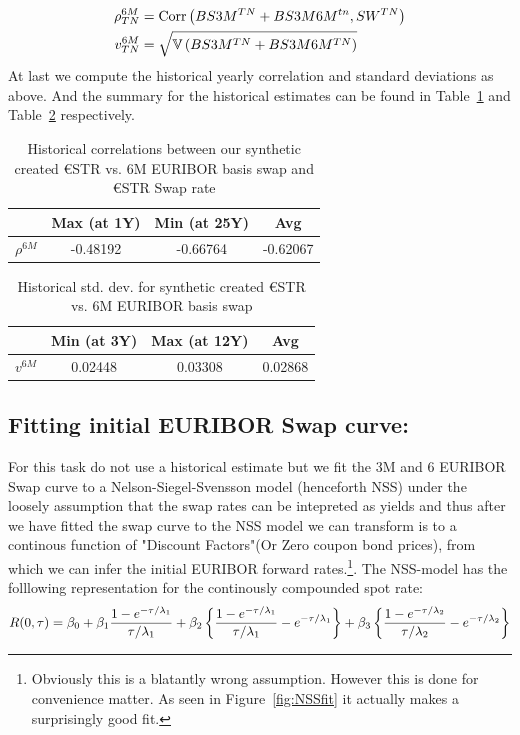 \documentclass[12pt]{article}
\begin{document}
\begin{equation}
    \notag \begin{aligned}
        \rho^{6M}_{TN} &= \text{Corr} \left(BS3M^{TN} + BS3M6M^{tn} , SW^{TN}  \right)
    \\ v^{6M}_{TN} & = \sqrt{\mathbb{V} \left( BS3M^{TN} + BS3M6M^{TN} \right)}
    \end{aligned}
\end{equation}
At last we compute the historical yearly correlation and standard deviations
as above. And the summary for the historical estimates can be found
in Table~\ref{tab:Corr6MBasis} and Table~\ref{tab:stdDev6MBasis} respectively.
\begin{table}[H]
    \centering
    \begin{tabular}{|c|c|c|c|}
    \hline
        &Max (at 1Y) & Min (at 25Y) & Avg  \\ \hline \hline
       $\rho^{6M}$& -0.48192 & -0.66764 & -0.62067  \\ \hline
    \end{tabular}
    \caption{Historical correlations between our synthetic created €STR vs. 6M EURIBOR
    basis swap and €STR Swap rate}
    \label{tab:Corr6MBasis}
\end{table}
\begin{table}[H]
    \centering
    \begin{tabular}{|c|c|c|c|}
    \hline
            &  Min (at 3Y) & Max (at 12Y) & Avg  \\ \hline \hline
       $v^{6M}$ & 0.02448 & 0.03308 & 0.02868 \\ \hline
    \end{tabular}
    \caption{Historical std. dev. for synthetic created €STR vs. 6M EURIBOR
    basis swap}
    \label{tab:stdDev6MBasis}
\end{table}
\subsection{Fitting initial EURIBOR Swap curve:} %
\label{sub:fitting_initial_euribor_curve_}
For this task do not use a historical
estimate but we fit the 3M and 6 EURIBOR Swap curve
to a Nelson-Siegel-Svensson model (henceforth NSS)
under the loosely assumption that the swap rates
can be intepreted as yields and thus after we have
fitted the swap curve to the NSS model we can
transform is to a continous function of "Discount Factors"(Or
Zero coupon bond prices), from which we can infer the
initial EURIBOR forward rates.\footnote{Obviously
this is a blatantly wrong assumption. However this is done
for convenience matter. As seen in Figure~\ref{fig:NSSfit} it actually makes a
surprisingly good fit.
}.
The NSS-model has the folllowing representation for the continously compounded
spot rate:
\begin{equation}
    \notag R(0,\tau ) = \beta_0 + \beta_1
    \frac{1- e ^{-\tau / \lambda_1}}{\tau / \lambda_1}
    + \beta_2
    \left\{ \frac{1- e ^{-\tau / \lambda_1}}{\tau / \lambda_1}
    - e ^{-\tau / \lambda_1} \right\}
     + \beta_3 \left\{ \frac{1- e ^{-\tau / \lambda_2}}{\tau / \lambda_2}
    - e ^{-\tau / \lambda_2} \right\}
\end{equation}
\end{document}
